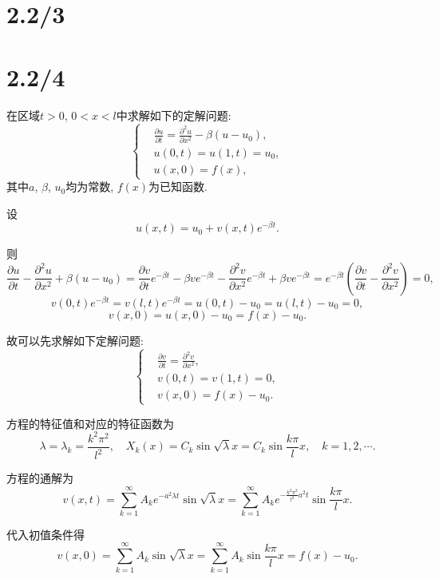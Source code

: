 \documentclass[11pt,a4paper]{article}
\author{刘逸灏 (515370910207)}
\begin{document}
\maketitle

\section{2.2/3}



\section{2.2/4}
\begin{problem}
  在区域$t>0$, $0<x<l$中求解如下的定解问题:
  $$\left\{\begin{aligned}
       & \frac{\partial u}{\partial t}=\frac{\partial^2u}{\partial x^2}-\beta(u-u_0),\\
       & u(0,t) = u(1,t)=u_0,\\
       & u(x,0)=f(x),
    \end{aligned}\right.$$
    其中$a$, $\beta$, $u_0$均为常数, $f(x)$为已知函数.
\end{problem}

设
$$u(x,t)=u_0+v(x,t)e^{-\beta t}.$$

则
$$\frac{\partial u}{\partial t}-\frac{\partial^2u}{\partial x^2}+\beta(u-u_0)=\frac{\partial v}{\partial t}e^{-\beta t}-\beta ve^{-\beta t}-\frac{\partial^2v}{\partial x^2}e^{-\beta t}+\beta ve^{-\beta t}=e^{-\beta t}\left(\frac{\partial v}{\partial t}-\frac{\partial^2v}{\partial x^2}\right)=0,$$
$$v(0,t)e^{-\beta t}=v(l,t)e^{-\beta t}=u(0,t)-u_0=u(l,t)-u_0=0,$$
$$v(x,0)=u(x,0)-u_0=f(x)-u_0.$$

故可以先求解如下定解问题:
$$\left\{\begin{aligned}
     & \frac{\partial v}{\partial t}=\frac{\partial^2v}{\partial x^2},\\
     & v(0,t) = v(1,t)=0,\\
     & v(x,0)=f(x)-u_0.
  \end{aligned}\right.$$

方程的特征值和对应的特征函数为
$$\lambda=\lambda_k=\frac{k^2\pi^2}{l^2},\quad X_k(x)=C_k\sin\sqrt{\lambda}x=C_k\sin\frac{k\pi}{l} x,\quad k=1,2,\cdots.$$

方程的通解为
$$v(x,t)=\sum_{k=1}^\infty A_ke^{-a^2\lambda t}\sin\sqrt{\lambda}x=\sum_{k=1}^\infty A_ke^{-\frac{k^2\pi^2}{l^2}a^2t}\sin \frac{k\pi}{l} x.$$

代入初值条件得
$$v(x,0)=\sum_{k=1}^\infty A_k\sin\sqrt{\lambda}x=\sum_{k=1}^\infty A_k\sin \frac{k\pi}{l} x=f(x)-u_0.$$
\end{document}
